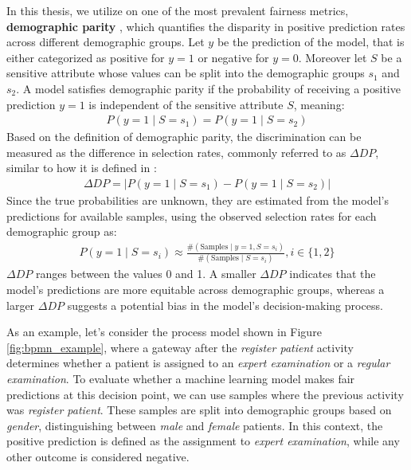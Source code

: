 In this thesis, we utilize on one of the most prevalent fairness metrics, \textbf{demographic parity} \cite{demographic_parity},
which quantifies the disparity in positive prediction rates across different demographic groups. 
Let $y$ be the prediction of the model, that is either categorized as positive for $y = 1$ or negative for $y = 0$.
Moreover let $S$ be a sensitive attribute whose values can be split into the demographic groups $s_1$ and $s_2$.
A model satisfies demographic parity if the probability of receiving a positive prediction $y = 1$
is independent of the sensitive attribute $S$, meaning:
\begin{align}
P(y = 1 \mid S = s_1) = P(y = 1 \mid S = s_2)
\end{align}
Based on the definition of demographic parity, the discrimination can be measured as the difference in selection rates,
commonly referred to as $\Delta \textit{DP}$, similar to how it is defined in \cite{fairness_foundation}:
\begin{align}
\Delta \textit{DP} = \left\vert P(y = 1 \mid S = s_1) - P(y = 1 \mid S = s_2) \right\vert
\end{align}
Since the true probabilities are unknown, they are estimated from the model's predictions for available samples,
using the observed selection rates for each demographic group as:
\begin{align}
P(y = 1 \mid S = s_i) \approx \frac{\#(\text{Samples} \mid y = 1, S = s_i)}{\#(\text{Samples} \mid S = s_i)}, i \in \{1,2\}
\end{align}
$\Delta \textit{DP}$ ranges between the values 0 and 1.
A smaller $\Delta \textit{DP}$ indicates that the model's predictions are more equitable across demographic groups,
whereas a larger $\Delta \textit{DP}$ suggests a potential bias in the model's decision-making process.

As an example, let's consider the process model shown in Figure \ref{fig:bpmn_example},
where a gateway after the \textit{register patient} activity determines whether a patient
is assigned to an \textit{expert examination} or a \textit{regular examination}.
To evaluate whether a machine learning model makes fair predictions at this decision point,
we can use samples where the previous activity was \textit{register patient}.
These samples are split into demographic groups based on \textit{gender}, distinguishing between \textit{male} and \textit{female} patients.
In this context, the positive prediction is defined as the assignment to \textit{expert examination}, while any other outcome is considered negative.


